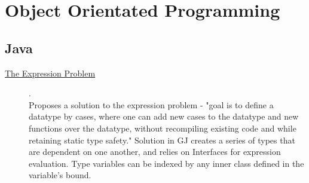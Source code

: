 \chapter {Object Orientated Programming}

\section{Java}

\begin{description}
    \item[\href{http://homepages.inf.ed.ac.uk/wadler/papers/expression/expression.txt}{The Expression Problem}] {\cite{wadler1998expression}.
          \\ Proposes a solution to the expression problem - "goal is to define a datatype by cases, where one can add new cases to the datatype and new functions over the datatype, without recompiling existing code and while retaining static type safety." Solution in GJ creates a series of types that are dependent on one another, and relies on Interfaces for expression evaluation. Type variables can be indexed by any inner class defined in the variable's bound.
          \\ }
\end{description}
